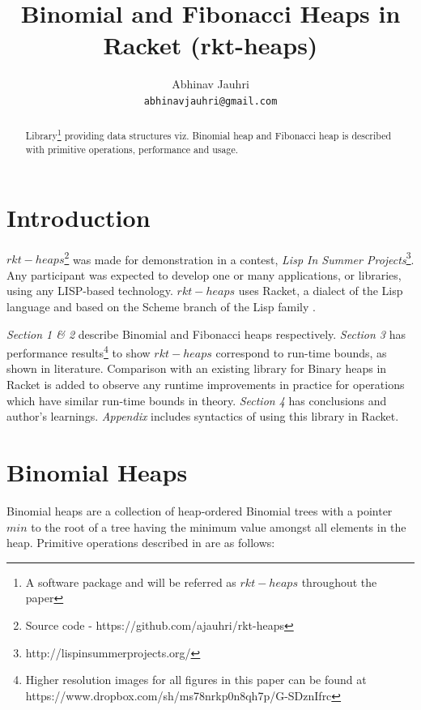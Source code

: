 \documentclass{llncs}
\title{Binomial and Fibonacci Heaps in Racket (rkt-heaps)}
\begin{document}
\author{
	Abhinav Jauhri\\
	\texttt{abhinavjauhri@gmail.com}\\
}

\maketitle

\begin{abstract}
	Library\footnote{A software package and will be referred as $rkt-heaps$ throughout the paper} providing data structures viz. Binomial heap \cite{vuillemin1978data} and Fibonacci heap\cite{fredman1987fibonacci} is described with primitive operations, performance and usage. 
\end{abstract}

\section{Introduction}
$rkt-heaps$\footnote{Source code - https://github.com/ajauhri/rkt-heaps} was made for demonstration in a contest, \textit{Lisp In Summer Projects}\footnote{http://lispinsummerprojects.org/}. Any participant was expected to develop one or many applications, or libraries, using any LISP-based technology. $rkt-heaps$ uses Racket, a dialect of the Lisp language and based on the Scheme branch of the Lisp family \cite{racket_dialect}. 

\emph{Section 1 \& 2} describe Binomial and Fibonacci heaps respectively. \emph{Section 3} has performance results\footnote{Higher resolution images for all figures in this paper can be found at https://www.dropbox.com/sh/ms78nrkp0n8qh7p/G-SDznIfrc} to show $rkt-heaps$ correspond to run-time bounds, as shown in literature. Comparison with an existing library for Binary heaps\cite{racket_binary} in Racket is added to observe any runtime improvements in practice for operations which have similar run-time bounds in theory. \emph{Section 4} has conclusions and author's learnings. \emph{Appendix} includes syntactics of using this library in Racket. 

\section{Binomial Heaps}
Binomial heaps are a collection of heap-ordered Binomial trees with a pointer $min$ to the root of a tree having the minimum value amongst all elements in the heap. Primitive operations described in \cite{kozen1992design} are as follows: \\
\end{document}
